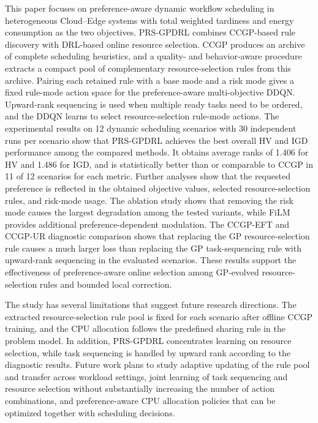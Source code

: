 \documentclass[10pt,journal]{IEEEtran}
\begin{document}
This paper focuses on preference-aware dynamic workflow scheduling in heterogeneous Cloud--Edge systems with total weighted tardiness and energy consumption as the two objectives. PRS-GPDRL combines CCGP-based rule discovery with DRL-based online resource selection. CCGP produces an archive of complete scheduling heuristics, and a quality- and behavior-aware procedure extracts a compact pool of complementary resource-selection rules from this archive. Pairing each retained rule with a base mode and a risk mode gives a fixed rule-mode action space for the preference-aware multi-objective DDQN. Upward-rank sequencing is used when multiple ready tasks need to be ordered, and the DDQN learns to select resource-selection rule-mode actions. The experimental results on 12 dynamic scheduling scenarios with 30 independent runs per scenario show that PRS-GPDRL achieves the best overall HV and IGD performance among the compared methods. It obtains average ranks of 1.406 for HV and 1.486 for IGD, and is statistically better than or comparable to CCGP in 11 of 12 scenarios for each metric. Further analyses show that the requested preference is reflected in the obtained objective values, selected resource-selection rules, and risk-mode usage. The ablation study shows that removing the risk mode causes the largest degradation among the tested variants, while FiLM provides additional preference-dependent modulation. The CCGP-EFT and CCGP-UR diagnostic comparison shows that replacing the GP resource-selection rule causes a much larger loss than replacing the GP task-sequencing rule with upward-rank sequencing in the evaluated scenarios. These results support the effectiveness of preference-aware online selection among GP-evolved resource-selection rules and bounded local correction.

The study has several limitations that suggest future research directions. The extracted resource-selection rule pool is fixed for each scenario after offline CCGP training, and the CPU allocation follows the predefined sharing rule in the problem model. In addition, PRS-GPDRL concentrates learning on resource selection, while task sequencing is handled by upward rank according to the diagnostic results. Future work plans to study adaptive updating of the rule pool and transfer across workload settings, joint learning of task sequencing and resource selection without substantially increasing the number of action combinations, and preference-aware CPU allocation policies that can be optimized together with scheduling decisions.



\end{document}

